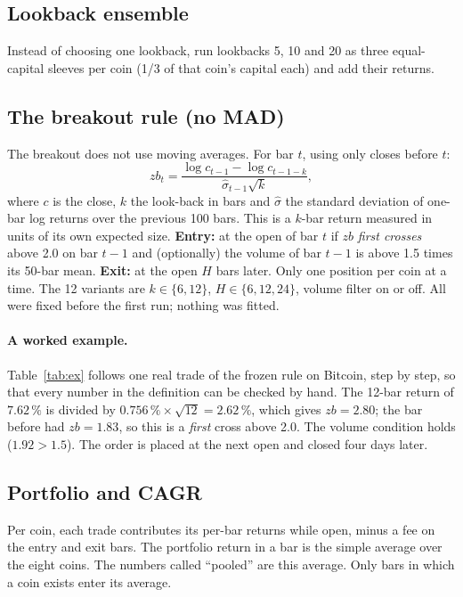 \documentclass[11pt,a4paper]{article}
\begin{document}
\subsection{Lookback ensemble}
Instead of choosing one lookback, run lookbacks 5, 10 and 20 as three equal-capital sleeves per coin (1/3 of that coin's capital each) and add their returns.

\subsection{The breakout rule (no MAD)}\label{sec:bo}
The breakout does not use moving averages. For bar $t$, using only closes before $t$:
\[
zb_{t}=\frac{\log c_{t-1}-\log c_{t-1-k}}{\hat\sigma_{t-1}\sqrt{k}},
\]
where $c$ is the close, $k$ the look-back in bars and $\hat\sigma$ the standard deviation of one-bar log returns over the previous 100 bars. This is a $k$-bar return measured in units of its
own expected size. \textbf{Entry:} at the open of bar $t$ if $zb$ \emph{first crosses} above 2.0 on bar $t-1$ and (optionally) the volume of bar $t-1$ is above 1.5 times its 50-bar mean.
\textbf{Exit:} at the open $H$ bars later. Only one position per coin at a time. The 12 variants are $k\in\{6,12\}$, $H\in\{6,12,24\}$, volume filter on or off. All were fixed before the first run;
nothing was fitted.


\paragraph{A worked example.} Table~\ref{tab:ex} follows one real trade of the frozen rule on Bitcoin, step by step, so that every number in the definition can be checked by hand.
The 12-bar return of $7.62\,\%$ is divided by $0.756\,\%\times\sqrt{12}=2.62\,\%$, which gives $zb=2.80$; the bar before had $zb=1.83$, so this is a \emph{first} cross above 2.0.
The volume condition holds ($1.92>1.5$). The order is placed at the next open and closed four days later.
\begin{table}[H]\centering\small
\caption{One trade of the frozen rule (BTC, February 2024).}\label{tab:ex}
\end{table}

\subsection{Portfolio and CAGR}
Per coin, each trade contributes its per-bar returns while open, minus a fee on the entry and exit bars. The portfolio return in a bar is the simple average over the eight coins. The
numbers called ``pooled'' are this average. Only bars in which a coin exists enter its average.
\end{document}
